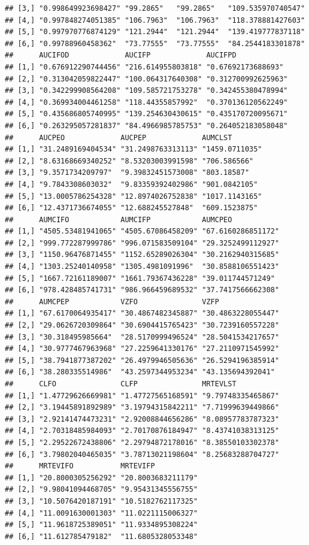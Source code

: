 \documentclass[12pt,]{krantz}
\theoremstyle{definition}
\theoremstyle{definition}
\theoremstyle{definition}
\theoremstyle{remark}
\begin{document}
\begin{verbatim}
## [3,] "0.998649923698427" "99.2865"   "99.2865"   "109.535970740547"
## [4,] "0.997848274051385" "106.7963"  "106.7963"  "118.378881427603"
## [5,] "0.997970776874129" "121.2944"  "121.2944"  "139.419777837118"
## [6,] "0.99788960458362"  "73.77555"  "73.77555"  "84.2544183301878"
##      AUCIFOD             AUCIFP             AUCIFPD            
## [1,] "0.676912290744456" "216.614955803818" "0.67692173688693" 
## [2,] "0.313042059822447" "100.064317640308" "0.312700992625963"
## [3,] "0.342299908564208" "109.585721753278" "0.342455380478994"
## [4,] "0.369934004461258" "118.44355857992"  "0.370136120562249"
## [5,] "0.435686805740995" "139.254630430615" "0.435170720095671"
## [6,] "0.263295057281837" "84.4966985785753" "0.264052183058048"
##      AUCPEO             AUCPEP             AUMCLST       
## [1,] "31.2489169404534" "31.2498763313113" "1459.0711035"
## [2,] "8.63168669340252" "8.53203003991598" "706.586566"  
## [3,] "9.3571734209797"  "9.39832451573008" "803.18587"   
## [4,] "9.7843308603032"  "9.83359392402986" "901.0842105" 
## [5,] "13.0005786254328" "12.8974026752838" "1017.1143165"
## [6,] "12.4371736674055" "12.688245527848"  "609.1523875" 
##      AUMCIFO            AUMCIFP            AUMCPEO           
## [1,] "4505.53481941065" "4505.67086458209" "67.6160286851172"
## [2,] "999.772287999786" "996.071583509104" "29.3252499112927"
## [3,] "1150.96476871455" "1152.65289026304" "30.2162940315685"
## [4,] "1303.25240140958" "1305.4981091996"  "30.8588106551423"
## [5,] "1667.72161189007" "1661.79367436228" "39.011744571249" 
## [6,] "978.428485741731" "986.966459689532" "37.7417566662308"
##      AUMCPEP            VZFO               VZFP              
## [1,] "67.6170064935417" "30.4867482345887" "30.4863228055447"
## [2,] "29.0626720309864" "30.6904415765423" "30.7239160557228"
## [3,] "30.318495985664"  "28.5170999496524" "28.5041534217657"
## [4,] "30.9777467963968" "27.2259641330176" "27.2110971545992"
## [5,] "38.7941877387202" "26.4979946505636" "26.5294196385914"
## [6,] "38.280335514986"  "43.2597344953234" "43.135694392041" 
##      CLFO               CLFP               MRTEVLST          
## [1,] "1.47729626669981" "1.47727565168591" "9.79748335465867"
## [2,] "3.19445891892989" "3.19794315842211" "7.71999639449866"
## [3,] "2.92141474473231" "2.92008844656286" "8.08957783787323"
## [4,] "2.70318485984093" "2.70170876184947" "8.43741038313125"
## [5,] "2.29522672438806" "2.29794872178016" "8.38550103302378"
## [6,] "3.79802040465035" "3.78713021198604" "8.25683288704727"
##      MRTEVIFO           MRTEVIFP          
## [1,] "20.8000305256292" "20.8003683211179"
## [2,] "9.98041094468705" "9.95431345556755"
## [3,] "10.5076420187191" "10.5182762117325"
## [4,] "11.0091630001303" "11.0221115006327"
## [5,] "11.9618725389051" "11.9334895308224"
## [6,] "11.612785479182"  "11.6805328053348"
\end{verbatim}
\end{document}
